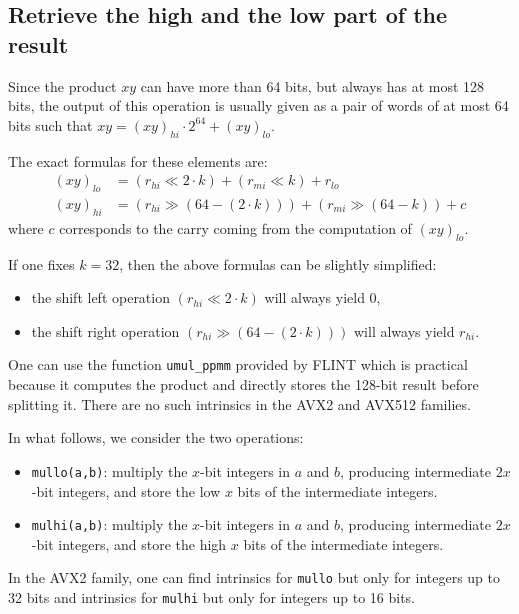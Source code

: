 \documentclass[a4paper]{article}
\begin{document}
\subsection{Retrieve the high and the low part of the result}

Since the product $xy$ can have more than 64 bits, but always has at most 128 bits, the output of this operation is usually given as a pair of words of at most 64 
bits such that $xy = (xy)_{hi}\cdot 2^{64} + (xy)_{lo}$.

\bigskip
The exact formulas for these elements are:
\begin{align}
    (xy)_{lo} &= (r_{hi} \ll 2\cdot k) + (r_{mi} \ll k) + r_{lo} \nonumber \\
    (xy)_{hi} &= (r_{hi} \gg (64 - (2\cdot k))) + (r_{mi} \gg (64 - k)) + c \label{carry}
\end{align}
where $c$ corresponds to the carry coming from the computation of $(xy)_{lo}$.

\begin{remark}
    If one fixes $k=32$, then the above formulas can be slightly simplified:
    \begin{itemize}
        \item the shift left operation $(r_{hi} \ll 2\cdot k)$ will always yield 0,
        \item the shift right operation $(r_{hi} \gg (64 - (2\cdot k)))$ will always yield $r_{hi}$.
    \end{itemize}
\end{remark}

\bigskip
One can use the function \texttt{umul\_ppmm} provided by FLINT which is practical because it computes the product and
directly stores the 128-bit result before splitting it.
There are no such intrinsics in the AVX2 and AVX512 families.

\bigskip
In what follows, we consider the two operations:
\begin{itemize}
    \item \texttt{mullo(a,b)}: multiply the $x$-bit integers in $a$ and $b$, producing intermediate $2x$-bit integers, 
    and store the low $x$ bits of the intermediate integers.
    \item \texttt{mulhi(a,b)}: multiply the $x$-bit integers in $a$ and $b$, producing intermediate $2x$-bit integers, 
    and store the high $x$ bits of the intermediate integers.
\end{itemize}

In the AVX2 family, one can find intrinsics for \texttt{mullo} but only for integers up to 32 bits and intrinsics for 
\texttt{mulhi} but only for integers up to 16 bits.
\end{document}

